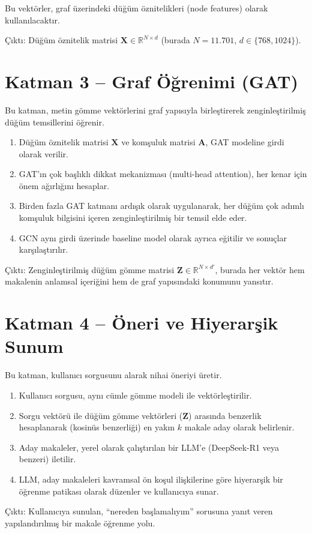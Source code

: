 Bu vektörler, graf üzerindeki düğüm öznitelikleri (node features) olarak kullanılacaktır.

Çıktı: Düğüm öznitelik matrisi $\mathbf{X} \in \mathbb{R}^{N \times d}$ (burada $N = 11.701$, $d \in \{768, 1024\}$).

\section{Katman 3 -- Graf Öğrenimi (GAT)}

Bu katman, metin gömme vektörlerini graf yapısıyla birleştirerek zenginleştirilmiş düğüm temsillerini öğrenir.

\begin{enumerate}
    \item Düğüm öznitelik matrisi $\mathbf{X}$ ve komşuluk matrisi $\mathbf{A}$, GAT modeline girdi olarak verilir.
    \item GAT'ın çok başlıklı dikkat mekanizması (multi-head attention), her kenar için önem ağırlığını hesaplar.
    \item Birden fazla GAT katmanı ardışık olarak uygulanarak, her düğüm çok adımlı komşuluk bilgisini içeren zenginleştirilmiş bir temsil elde eder.
    \item GCN aynı girdi üzerinde baseline model olarak ayrıca eğitilir ve sonuçlar karşılaştırılır.
\end{enumerate}

Çıktı: Zenginleştirilmiş düğüm gömme matrisi $\mathbf{Z} \in \mathbb{R}^{N \times d'}$, burada her vektör hem makalenin anlamsal içeriğini hem de graf yapısındaki konumunu yansıtır.

\section{Katman 4 -- Öneri ve Hiyerarşik Sunum}

Bu katman, kullanıcı sorgusunu alarak nihai öneriyi üretir.

\begin{enumerate}
    \item Kullanıcı sorgusu, aynı cümle gömme modeli ile vektörleştirilir.
    \item Sorgu vektörü ile düğüm gömme vektörleri ($\mathbf{Z}$) arasında benzerlik hesaplanarak (kosinüs benzerliği) en yakın $k$ makale aday olarak belirlenir.
    \item Aday makaleler, yerel olarak çalıştırılan bir LLM'e (DeepSeek-R1 veya benzeri) iletilir.
    \item LLM, aday makaleleri kavramsal ön koşul ilişkilerine göre hiyerarşik bir öğrenme patikası olarak düzenler ve kullanıcıya sunar.
\end{enumerate}

Çıktı: Kullanıcıya sunulan, ``nereden başlamalıyım'' sorusuna yanıt veren yapılandırılmış bir makale öğrenme yolu.